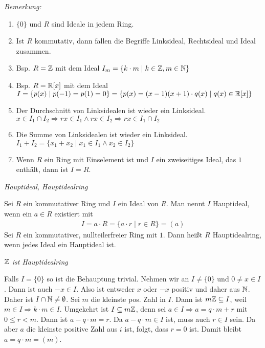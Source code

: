 \textit{Bemerkung:}
\begin{enumerate}
    \item $\{ 0 \}$ und $R$ sind Ideale in jedem Ring.
    \item Ist $R$ kommutativ, dann fallen die Begriffe Linksideal, Rechtsideal und Ideal zusammen.
    \item Bsp. $R = \mathbb{Z}$ mit dem Ideal $I_m = \left\{ k\cdot m \mid k\in \mathbb{Z}, m\in \mathbb{N} \right\}$
    \item Bsp. $R = \mathbb{R}[x]$ mit dem Ideal $I = \{ p(x) \mid p(-1) = p(1) = 0 \} = \{ p(x) = (x-1)(x+1) \cdot q(x) \mid q(x) \in \mathbb{R}[x] \}$
    \item Der Durchschnitt von Linksidealen ist wieder ein Linksideal.
        $x \in I_1 \cap I_2 \Rightarrow rx \in I_1 \wedge rx \in I_2 \Rightarrow rx \in I_1\cap I_2$
    \item Die Summe von Linksidealen ist wieder ein Linksideal.
        $I_1 + I_2 = \{ x_1 + x_2 \mid x_1 \in I_1 \wedge x_2 \in I_2\}$
    \item Wenn $R$ ein Ring mit Einselement ist und $I$ ein zweiseitiges Ideal, das $1$ enthält, dann ist $I=R$.
\end{enumerate}

\begin{mydef}\textit{Hauptideal, Hauptidealring}\medskip

    Sei $R$ ein kommutativer Ring und $I$ ein Ideal von $R$. Man nennt $I$ Hauptideal, wenn ein $a \in R$ existiert mit
    \begin{align*}
        I = a \cdot R = \{ a\cdot r \mid r\in R \} = (a)
    \end{align*}
    Sei $R$ ein kommutativer, nullteilerfreier Ring mit $1$. Dann heißt $R$ Hauptidealring, wenn jedes Ideal ein Hauptideal ist.
\end{mydef}


\begin{mylemma} \textit{$\mathbb{Z}$ ist Hauptidealring}\medskip

    Falls $I=\{ 0 \}$ so ist die Behauptung trivial. Nehmen wir an $I \neq \{ 0 \}$ und $0 \neq x \in I$. Dann ist auch $-x \in I$. Also ist entweder $x$ oder $-x$ positiv und daher aus $\mathbb{N}$. Daher ist $I \cap \mathbb{N} \neq \emptyset$.
    Sei $m$ die kleinste pos. Zahl in $I$. Dann ist $m \mathbb{Z} \subseteq I$, weil $m \in I \Rightarrow k \cdot m \in I$. Umgekehrt ist $I \subseteq m\mathbb{Z}$, denn sei $a \in I \Rightarrow a = q \cdot m + r$ mit $0 \leq r<m$. Dann ist $a-q\cdot m=r$. Da $a-q\cdot m \in I$ ist, muss auch $r \in I$ sein. Da aber $a$ die kleinste positive Zahl aus $i$ ist, folgt, dass $r=0$ ist. Damit bleibt $a=q\cdot m = (m)$.
\end{mylemma}

